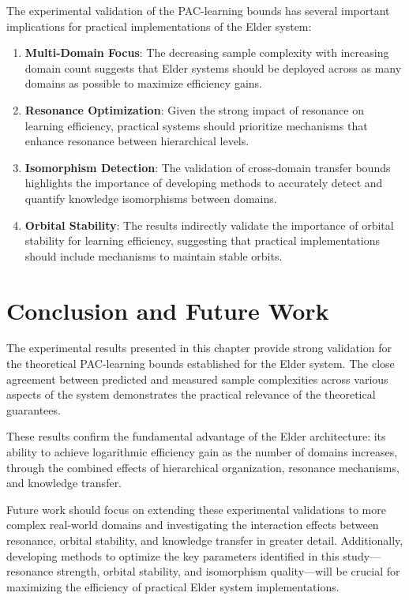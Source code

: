 The experimental validation of the PAC-learning bounds has several important implications for practical implementations of the Elder system:

\begin{enumerate}
    \item \textbf{Multi-Domain Focus}: The decreasing sample complexity with increasing domain count suggests that Elder systems should be deployed across as many domains as possible to maximize efficiency gains.
    
    \item \textbf{Resonance Optimization}: Given the strong impact of resonance on learning efficiency, practical systems should prioritize mechanisms that enhance resonance between hierarchical levels.
    
    \item \textbf{Isomorphism Detection}: The validation of cross-domain transfer bounds highlights the importance of developing methods to accurately detect and quantify knowledge isomorphisms between domains.
    
    \item \textbf{Orbital Stability}: The results indirectly validate the importance of orbital stability for learning efficiency, suggesting that practical implementations should include mechanisms to maintain stable orbits.
\end{enumerate}

\section{Conclusion and Future Work}

The experimental results presented in this chapter provide strong validation for the theoretical PAC-learning bounds established for the Elder system. The close agreement between predicted and measured sample complexities across various aspects of the system demonstrates the practical relevance of the theoretical guarantees.

These results confirm the fundamental advantage of the Elder architecture: its ability to achieve logarithmic efficiency gain as the number of domains increases, through the combined effects of hierarchical organization, resonance mechanisms, and knowledge transfer.

Future work should focus on extending these experimental validations to more complex real-world domains and investigating the interaction effects between resonance, orbital stability, and knowledge transfer in greater detail. Additionally, developing methods to optimize the key parameters identified in this study—resonance strength, orbital stability, and isomorphism quality—will be crucial for maximizing the efficiency of practical Elder system implementations.